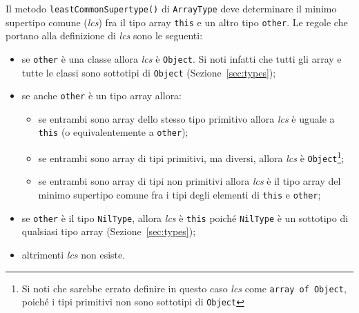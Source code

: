 Il metodo \texttt{leastCommonSupertype()} di
\texttt{ArrayType} deve determinare il minimo supertipo comune
(\emph{lcs}) fra il tipo array \texttt{this} e un altro tipo \texttt{other}.
Le regole che portano alla definizione di \emph{lcs} sono le seguenti:
%
\begin{itemize}
\item se \texttt{other} \`e una classe allora \emph{lcs} \`e \texttt{Object}.
      Si noti infatti che tutti gli array e tutte le classi sono
      sottotipi di \texttt{Object} (Sezione~\ref{sec:types});
\item se anche \texttt{other} \`e un tipo array allora:
      \begin{itemize}
      \item se entrambi sono array dello stesso tipo primitivo
            allora \emph{lcs} \`e uguale
            a \texttt{this} (o equivalentemente a \texttt{other});
      \item se entrambi sono array di tipi primitivi, ma diversi,
            allora \emph{lcs} \`e \texttt{Object}\footnote{Si noti che sarebbe
            errato definire in questo caso \emph{lcs} come
            \texttt{array of Object}, poich\'e i tipi primitivi non sono
            sottotipi di \texttt{Object}};
      \item se entrambi sono array di tipi non primitivi
            allora \emph{lcs} \`e il tipo array del minimo supertipo comune
            fra i tipi degli elementi di \texttt{this} e \texttt{other};
      \end{itemize}
\item se \texttt{other} \`e il tipo \texttt{NilType}, allora
      \emph{lcs} \`e \texttt{this} poich\'e \texttt{NilType} \`e un
      sottotipo di qualsiasi tipo array (Sezione~\ref{sec:types});
\item altrimenti \emph{lcs} non esiste.
\end{itemize}

